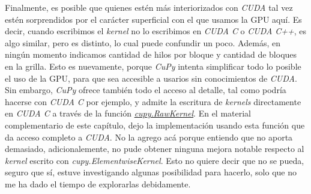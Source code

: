 Finalmente, es posible que quienes estén más interiorizados con \textit{CUDA} tal vez estén sorprendidos por el carácter superficial con el que 
usamos la GPU aquí. Es decir, cuando escribimos el \textit{kernel} no lo escribimos en \textit{CUDA C} o \textit{CUDA C++}, es algo similar, pero 
es distinto, lo cual puede confundir un poco. Además, en ningún momento indicamos cantidad de hilos por bloque y cantidad de bloques en la 
grilla. Esto es nuevamente, porque \textit{CuPy} intenta simplificar todo lo posible el uso de la GPU, para que sea accesible a usarios sin conocimientos 
de \textit{CUDA}. Sin embargo, \textit{CuPy} ofrece también todo el acceso al detalle, tal como podría hacerse con \textit{CUDA C} por ejemplo,
y admite la escritura de \textit{kernels} directamente en \textit{CUDA C} a través de la función 
\href{https://docs.cupy.dev/en/stable/user_guide/kernel.html}{\textit{cupy.RawKernel}}. En el material complementario de este capítulo, dejo la 
implementación usando esta función que da acceso completo a \textit{CUDA}. No la agrego acá porque entiendo que no aporta demasiado, adicionalemente, no 
pude obtener ninguna mejora notable respecto al \textit{kernel} escrito con \textit{cupy.ElementwiseKernel}. Esto no quiere decir que no se pueda, seguro 
que sí, estuve investigando algunas posibilidad para hacerlo, solo que no me ha dado el tiempo de explorarlas debidamente.











